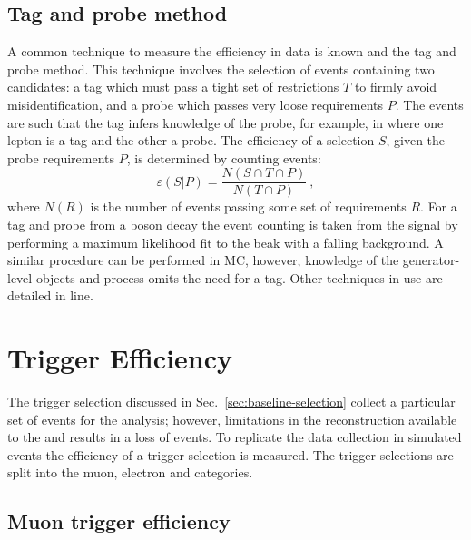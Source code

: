 \subsection{Tag and probe method}

A common technique to measure the efficiency in data is known and the tag and
probe method. This technique involves the selection of events containing two
candidates: a tag which must pass a tight set of restrictions $T$ to firmly
avoid misidentification, and a probe which passes very loose requirements $P$.
The events are such that the tag infers knowledge of the probe, for example,
in \IDYll where one lepton is a tag and the other a probe. The efficiency of a
selection $S$, given the probe requirements $P$, is determined by counting
events:
%
\begin{equation}
    \varepsilon(S|P) = \frac{N(S\cap T\cap P)}{N(T\cap P)}\ ,
\end{equation}
%
where $N(R)$ is the number of events passing some set of requirements $R$. For
a tag and probe from a \PZ boson decay the event counting is taken from the
signal by performing a maximum likelihood fit to the \PZ beak with a falling
background. A similar procedure can be performed in MC, however, knowledge of
the generator-level objects and process omits the need for a tag. Other
techniques in use are detailed in line.


\section{Trigger Efficiency}

The trigger selection discussed in Sec.~\ref{sec:baseline-selection} collect a
particular set of events for the analysis; however, limitations in the
reconstruction available to the \HWT and \SWT results in a loss of events. To
replicate the data collection in simulated events the efficiency of a trigger
selection is measured. The trigger selections are split into the muon,
electron and \ptmiss categories.


\subsection{Muon trigger efficiency}

